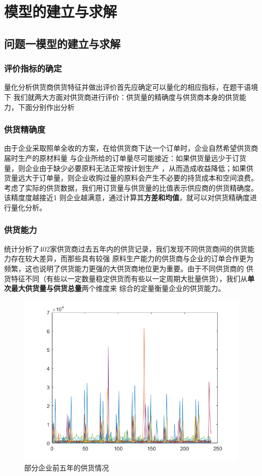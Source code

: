 \documentclass{cumcmthesis}
\begin{document}
\section{模型的建立与求解}
\subsection{问题一模型的建立与求解}

\subsubsection{评价指标的确定}
量化分析供货商供货特征并做出评价首先应确定可以量化的相应指标，在题干语境下
我们就两大方面对供货商进行评价：供货量的精确度与供货商本身的供货能力，下面分别作出分析
\subsubsection*{供货精确度}
由于企业采取照单全收的方案，在给供货商下达一个订单时，企业自然希望供货商届时生产的原材料量
与企业所给的订单量尽可能接近：如果供货量远少于订货量，则企业由于缺少必要原料无法正常按计划生产
，从而造成收益降低；如果供货量远大于订单量，则企业收购过量的原料会产生不必要的持货成本和空间浪费。考虑了实际的供货数据，我们用订货量与供货量的比值表示供应商的供货精确度。该精度度越接近1
则企业越满意，通过计算其\textbf{方差和均值}，就可以对供货精确度进行量化分析。

\subsubsection*{供货能力}
统计分析了402家供货商过去五年内的供货记录，我们发现不同供货商间的供货能力存在较大差异，而那些具有较强
原料生产能力的供货商与企业的订单合作更为频繁，这也说明了供货能力更强的大供货商地位更为重要。由于不同供货商的
供货特征不同（有些以一定数量稳定供货而有些以一定周期大批量供货），我们从\textbf{单次最大供货量与供货总量}两个维度来
综合的定量衡量企业的供货能力。\par
\begin{figure}[htbp]
    \centering
    \includegraphics[scale=0.6]{offer.png}
    \caption{部分企业前五年的供货情况}     \label{fig:1}
\end{figure}
\end{document}
